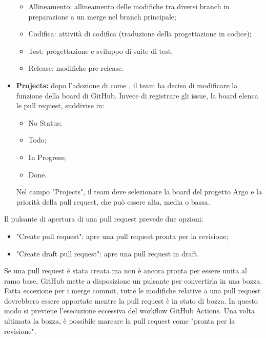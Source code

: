 \begin{itemize}
\begin{itemize}
    \item Allineamento: allineamento delle modifiche tra diversi branch in preparazione a un merge nel branch principale;
    \item Codifica: attività di codifica (traduzione della progettazione in codice);
    \item Test: progettazione e sviluppo di suite di test.
    \item Release: modifiche pre-release.
  \end{itemize}
  \item \textbf{Projects:} dopo l'adozione di  come , il team ha deciso di modificare la funzione della board di GitHub. Invece di registrare gli issue, la board elenca le pull request, suddivise in:
  \begin{itemize}
    \item No Status;
    \item Todo;
    \item In Progress;
    \item Done.
  \end{itemize}
  \par Nel campo "Projects", il team deve selezionare la board del progetto Argo e la priorità della pull request, che può essere alta, media o bassa.
\end{itemize}
\vspace{0.5\baselineskip}
\par Il pulsante di apertura di una pull request prevede due opzioni: 
\begin{itemize}
  \item "Create pull request": apre una pull request pronta per la revisione;
  \item "Create draft pull request": apre una pull request in draft.
\end{itemize} 
\vspace{0.5\baselineskip}
\par Se una pull request è stata creata ma non è ancora pronta per essere unita al ramo base, GitHub mette a disposizione un pulsante per convertirla in una bozza. Fatta eccezione per i merge commit, tutte le modifiche relative a una pull request dovrebbero essere apportate mentre la pull request è in stato di bozza. In questo modo si previene l'esecuzione eccessiva del workflow GitHub Actions. Una volta ultimata la bozza, è possibile marcare la pull request come "pronta per la revisione".

